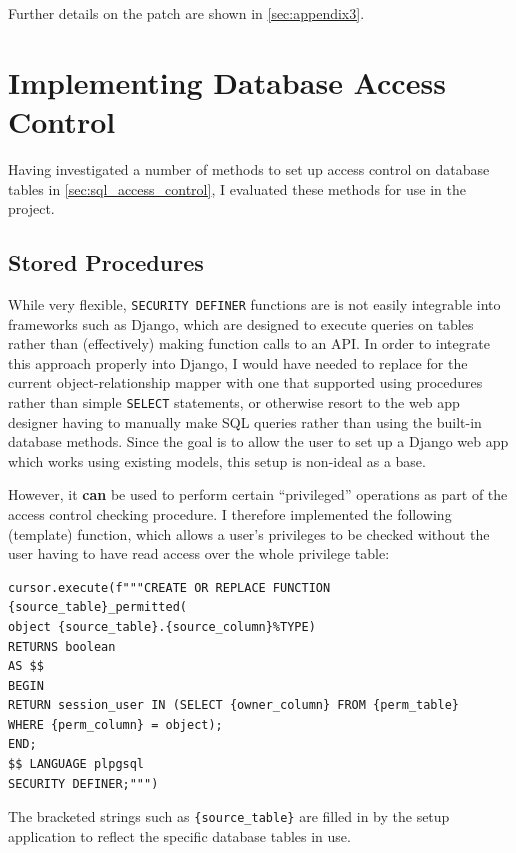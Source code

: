 \documentclass[12pt]{report}
\begin{document}
Further details on the patch are shown in \autoref{sec:appendix3}.

\section{Implementing Database Access Control}
\label{sec:implementing_database_access_control}
Having investigated a number of methods to set up access control on database tables in \autoref{sec:sql_access_control}, I evaluated these methods for use in the project.

\subsection{Stored Procedures}
While very flexible, \texttt{SECURITY DEFINER} functions are is not easily integrable into frameworks such as Django, which are designed to execute queries on tables rather than (effectively) making function calls to an API. In order to integrate this approach properly into Django, I would have needed to replace for the current object-relationship mapper with one that supported using procedures rather than simple \texttt{SELECT} statements, or otherwise resort to the web app designer having to manually make SQL queries rather than using the built-in database methods. Since the goal is to allow the user to set up a Django web app which works using existing models, this setup is non-ideal as a base.

However, it \textbf{can} be used to perform certain ``privileged'' operations as part of the access control checking procedure. I therefore implemented the following (template) function, which allows a user's privileges to be checked without the user having to have read access over the whole privilege table:

\begin{verbatim}
cursor.execute(f"""CREATE OR REPLACE FUNCTION {source_table}_permitted(
object {source_table}.{source_column}%TYPE)
RETURNS boolean
AS $$
BEGIN
RETURN session_user IN (SELECT {owner_column} FROM {perm_table}
WHERE {perm_column} = object);
END;
$$ LANGUAGE plpgsql
SECURITY DEFINER;""")
\end{verbatim}

The bracketed strings such as \verb+{source_table}+ are filled in by the setup application to reflect the specific database tables in use.
\end{document}
